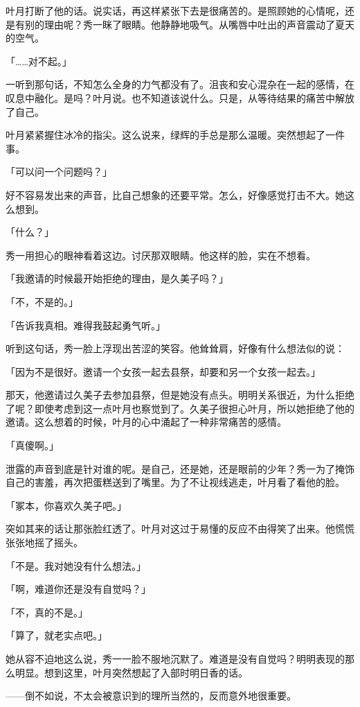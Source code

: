 \documentclass[UTF8]{ctexart}
\begin{document}
    叶月打断了他的话。说实话，再这样紧张下去是很痛苦的。是照顾她的心情呢，还是有别的理由呢？秀一眯了眼睛。他静静地吸气。从嘴唇中吐出的声音震动了夏天的空气。

    「……对不起。」

    一听到那句话，不知怎么全身的力气都没有了。沮丧和安心混杂在一起的感情，在叹息中融化。是吗？叶月说。也不知道该说什么。只是，从等待结果的痛苦中解放了自己。

    叶月紧紧握住冰冷的指尖。这么说来，绿辉的手总是那么温暖。突然想起了一件事。

    「可以问一个问题吗？」

    好不容易发出来的声音，比自己想象的还要平常。怎么，好像感觉打击不大。她这么想到。

    「什么？」

    秀一用担心的眼神看着这边。讨厌那双眼睛。他这样的脸，实在不想看。

    「我邀请的时候最开始拒绝的理由，是久美子吗？」

    「不，不是的。」

    「告诉我真相。难得我鼓起勇气听。」

    听到这句话，秀一脸上浮现出苦涩的笑容。他耸耸肩，好像有什么想法似的说：

    「因为不是很好。邀请一个女孩一起去县祭，却要和另一个女孩一起去。」

    那天，他邀请过久美子去参加县祭，但是她没有点头。明明关系很近，为什么拒绝了呢？即使考虑到这一点叶月也察觉到了。久美子很担心叶月，所以她拒绝了他的邀请。这么想着的时候，叶月的心中涌起了一种非常痛苦的感情。

    「真傻啊。」

    泄露的声音到底是针对谁的呢。是自己，还是她，还是眼前的少年？秀一为了掩饰自己的害羞，再次把蛋糕送到了嘴里。为了不让视线逃走，叶月看了看他的脸。

    「冢本，你喜欢久美子吧。」

    突如其来的话让那张脸红透了。叶月对这过于易懂的反应不由得笑了出来。他慌慌张张地摇了摇头。

    「不是。我对她没有什么想法。」

    「啊，难道你还是没有自觉吗？」

    「不，真的不是。」

    「算了，就老实点吧。」

    她从容不迫地这么说，秀一一脸不服地沉默了。难道是没有自觉吗？明明表现的那么明显。想到这里，叶月突然想起了入部时明日香的话。

    ——倒不如说，不太会被意识到的理所当然的，反而意外地很重要。
\end{document}

